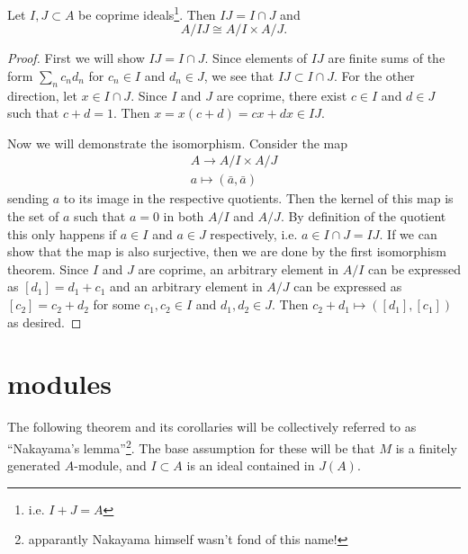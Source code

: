 \documentclass[12pt]{article}
\begin{document}
\begin{theorem}
	Let $I,J\subset A$ be coprime ideals\footnote{i.e. $I+J=A$}. Then $IJ=I\cap J$ and 
	\begin{equation*}
		A/IJ \cong A/I \times A/J.
	\end{equation*}
\end{theorem}
\begin{proof}
	First we will show $IJ=I\cap J$. Since elements of $IJ$ are finite sums of the form $\sum_n c_nd_n$ for $c_n\in I$ and $d_n\in J$, we see that $IJ\subset I\cap J$. For the other direction, let $x\in I\cap J$. Since $I$ and $J$ are coprime, there exist $c\in I$ and $d\in J$ such that $c+d=1$. Then $x=x(c+d)=cx+dx\in IJ$.

	Now we will demonstrate the isomorphism. Consider the map 
	\begin{gather*}
		A \to A/I \times A/J \\
		a \mapsto (\bar{a}, \bar{a})
	\end{gather*}
	sending $a$ to its image in the respective quotients. Then the kernel of this map is the set of $a$ such that $a=0$ in both $A/I$ and $A/J$. By definition of the quotient this only happens if $a\in I$ and $a\in J$ respectively, i.e. $a\in I\cap J=IJ$. If we can show that the map is also surjective, then we are done by the first isomorphism theorem. Since $I$ and $J$ are coprime, an arbitrary element in $A/I$ can be expressed as $[d_1] = d_1 + c_1$ and an arbitrary element in $A/J$ can be expressed as $[c_2] = c_2+d_2$ for some $c_1,c_2\in I$ and $d_1,d_2\in J$. Then $c_2+d_1\mapsto ([d_1], [c_1])$ as desired.
\end{proof}




\section{modules} %

The following theorem and its corollaries will be collectively referred to as ``Nakayama's lemma''\footnote{apparantly Nakayama himself wasn't fond of this name!}. The base assumption for these will be that $M$ is a finitely generated $A$-module, and $I\subset A$ is an ideal contained in $J(A)$. 
\end{document}
